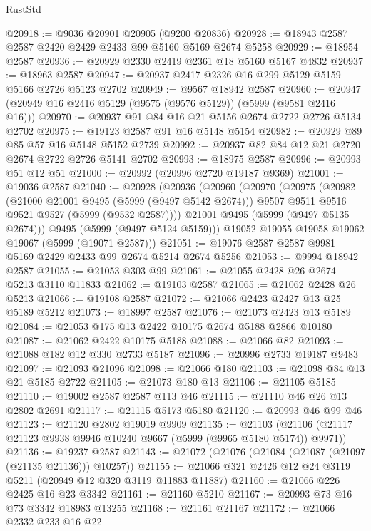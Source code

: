 \begin{lexlean}{RustStd}
\begin{coremodule}
@20918 := @9036 @20901 @20905 (@9200 @20836)
@20928 := @18943 @2587 @2587 @2420 @2429 @2433 @99 @5160 @5169 @2674 @5258
@20929 := @18954 @2587
@20936 := @20929 @2330 @2419 @2361 @18 @5160 @5167 @4832
@20937 := @18963 @2587
@20947 := @20937 @2417 @2326 @16 @299 @5129 @5159 @5166 @2726 @5123 @2702
@20949 := @9567 @18942 @2587
@20960 := @20947 (@20949 @16 @2416 @5129 (@9575 (@9576 @5129)) (@5999 (@9581 @2416 @16)))
@20970 := @20937 @91 @84 @16 @21 @5156 @2674 @2722 @2726 @5134 @2702
@20975 := @19123 @2587 @91 @16 @5148 @5154
@20982 := @20929 @89 @85 @57 @16 @5148 @5152 @2739
@20992 := @20937 @82 @84 @12 @21 @2720 @2674 @2722 @2726 @5141 @2702
@20993 := @18975 @2587
@20996 := @20993 @51 @12 @51
@21000 := @20992 (@20996 @2720 @19187 @9369)
@21001 := @19036 @2587
@21040 := @20928
    (@20936
      (@20960
        (@20970
          (@20975
            (@20982
              (@21000 @21001 @9495 (@5999 (@9497 @5142 @2674)))
              @9507
              @9511
              @9516
              @9521
              @9527
              (@5999 (@9532 @2587))))
          @21001
          @9495
          (@5999 (@9497 @5135 @2674)))
        @9495
        (@5999 (@9497 @5124 @5159)))
      @19052
      @19055
      @19058
      @19062
      @19067
      (@5999 (@19071 @2587)))
@21051 := @19076 @2587 @2587 @9981 @5169 @2429 @2433 @99 @2674 @5214 @2674 @5256
@21053 := @9994 @18942 @2587
@21055 := @21053 @303 @99
@21061 := @21055 @2428 @26 @2674 @5213 @3110 @11833
@21062 := @19103 @2587
@21065 := @21062 @2428 @26 @5213
@21066 := @19108 @2587
@21072 := @21066 @2423 @2427 @13 @25 @5189 @5212
@21073 := @18997 @2587
@21076 := @21073 @2423 @13 @5189
@21084 := @21053 @175 @13 @2422 @10175 @2674 @5188 @2866 @10180
@21087 := @21062 @2422 @10175 @5188
@21088 := @21066 @82
@21093 := @21088 @182 @12 @330 @2733 @5187
@21096 := @20996 @2733 @19187 @9483
@21097 := @21093 @21096
@21098 := @21066 @180
@21103 := @21098 @84 @13 @21 @5185 @2722
@21105 := @21073 @180 @13
@21106 := @21105 @5185
@21110 := @19002 @2587 @2587 @113 @46
@21115 := @21110 @46 @26 @13 @2802 @2691
@21117 := @21115 @5173 @5180
@21120 := @20993 @46 @99 @46
@21123 := @21120 @2802 @19019 @9909
@21135 := @21103 (@21106 (@21117 @21123 @9938 @9946 @10240 @9667 (@5999 (@9965 @5180 @5174)) @9971))
@21136 := @19237 @2587
@21143 := @21072 (@21076 (@21084 (@21087 (@21097 (@21135 @21136))) @10257))
@21155 := @21066 @321 @2426 @12 @24 @3119 @5211 (@20949 @12 @320 @3119 @11883 @11887)
@21160 := @21066 @226 @2425 @16 @23 @3342
@21161 := @21160 @5210
@21167 := @20993 @73 @16 @73 @3342 @18983 @13255
@21168 := @21161 @21167
@21172 := @21066 @2332 @233 @16 @22

\end{coremodule}
\end{lexlean}

